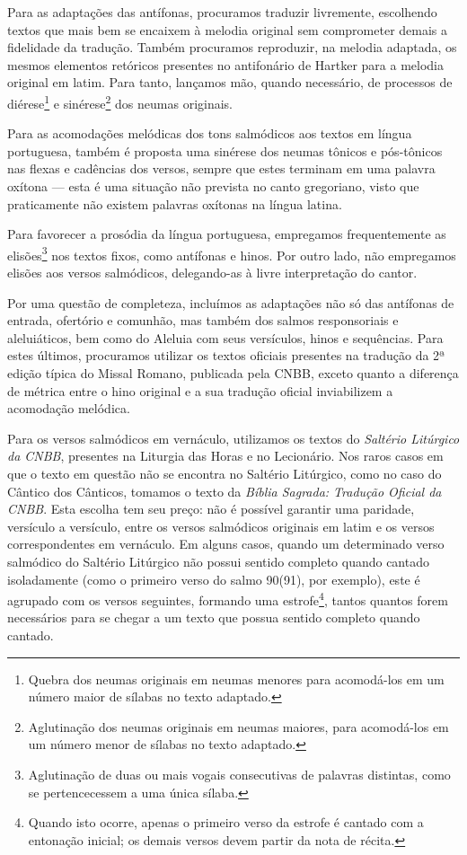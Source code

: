 Para as adaptações das antífonas, procuramos traduzir livremente, escolhendo textos que mais bem se encaixem à melodia original sem comprometer demais a fidelidade da tradução. Também procuramos reproduzir, na melodia adaptada, os mesmos elementos retóricos presentes no antifonário de Hartker para a melodia original em latim. Para tanto, lançamos mão, quando necessário, de processos de diérese\footnote{Quebra dos neumas originais em neumas menores para acomodá-los em um número maior de sílabas no texto adaptado.} e sinérese\footnote{Aglutinação dos neumas originais em neumas maiores, para acomodá-los em um número menor de sílabas no texto adaptado.} dos neumas originais.

Para as acomodações melódicas dos tons salmódicos aos textos em língua portuguesa, também é proposta uma sinérese dos neumas tônicos e pós-tônicos nas flexas e cadências dos versos, sempre que estes terminam em uma palavra oxítona --- esta é uma situação não prevista no canto gregoriano, visto que praticamente não existem palavras oxítonas na língua latina.

Para favorecer a prosódia da língua portuguesa, empregamos frequentemente as elisões\footnote{Aglutinação de duas ou mais vogais consecutivas de palavras distintas, como se pertencecessem a uma única sílaba.} nos textos fixos, como antífonas e hinos. Por outro lado, não empregamos elisões aos versos salmódicos, delegando-as à livre interpretação do cantor.

Por uma questão de completeza, incluímos as adaptações não só das antífonas de entrada, ofertório e comunhão, mas também dos salmos responsoriais e aleluiáticos, bem como do Aleluia com seus versículos, hinos e sequências. Para estes últimos, procuramos utilizar os textos oficiais presentes na tradução da 2ª edição típica do Missal Romano, publicada pela CNBB, exceto quanto a diferença de métrica entre o hino original e a sua tradução oficial inviabilizem a acomodação melódica.

Para os versos salmódicos em vernáculo, utilizamos os textos do \emph{Saltério Litúrgico da CNBB}, presentes na Liturgia das Horas e no Lecionário. Nos raros casos em que o texto em questão não se encontra no Saltério Litúrgico, como no caso do Cântico dos Cânticos, tomamos o texto da \emph{Bíblia Sagrada: Tradução Oficial da CNBB}. Esta escolha tem seu preço: não é possível garantir uma paridade, versículo a versículo, entre os versos salmódicos originais em latim e os versos correspondentes em vernáculo. Em alguns casos, quando um determinado verso salmódico do Saltério Litúrgico não possui sentido completo quando cantado isoladamente (como o primeiro verso do salmo 90(91), por exemplo), este é agrupado com os versos seguintes, formando uma estrofe\footnote{Quando isto ocorre, apenas o primeiro verso da estrofe é cantado com a entonação inicial; os demais versos devem partir da nota de récita.}, tantos quantos forem necessários para se chegar a um texto que possua sentido completo quando cantado.

